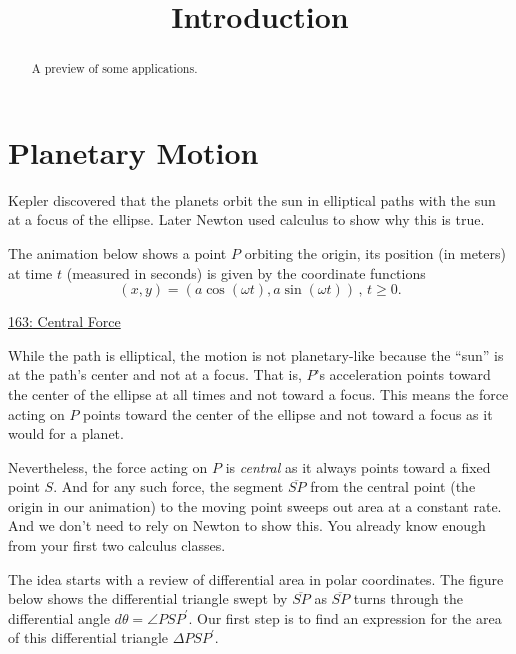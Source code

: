 \documentclass{ximera}
\title{Introduction}
\begin{document}
\begin{abstract}
A preview of some applications.
\end{abstract}
\maketitle


\section*{Planetary Motion}
Kepler discovered that the planets orbit the sun in elliptical paths with the sun at a focus of the ellipse. Later Newton used calculus to show why this is true. 

The animation below shows a point $P$ orbiting the origin, its position (in meters) at time $t$ (measured in seconds) is given by the coordinate functions
\[
       (x,y) = (a \cos (\omega t), a \sin(\omega t)) \, , \, t \geq 0.
\]

\begin{exploration}
\begin{onlineOnly}
    \begin{center}
\end{center}
\end{onlineOnly}

\href{https://www.desmos.com/calculator/5aq0sta5aa}{163: Central Force}
\end{exploration}


While the path is elliptical, the motion is not planetary-like because the ``sun'' is at the path's center and not at a focus. That is,  $P$'s acceleration points toward the center of the ellipse at all times and not toward a focus. This means the force acting on $P$ points toward the center of the ellipse and not toward a focus as it would for a planet. %

Nevertheless, the force acting on $P$ is \emph{central} as it always points toward a fixed point $S$. And for any such force, the segment $\overline{SP}$ from the central point (the origin in our animation) to the moving point sweeps out area at a constant rate. And we don't need to rely on Newton to show this. You already know enough from your first two calculus classes. %


The idea starts with a review of differential area in polar coordinates. The figure below shows the differential triangle swept by $\overline{SP}$ as $\overline{SP}$ turns through the differential angle $d\theta = \angle PSP^\prime$. Our first step is to find an expression for the area of this differential triangle $\Delta PSP^\prime$.
\begin{onlineOnly}
    \begin{center}
\end{center}
\end{onlineOnly}
\end{document}
